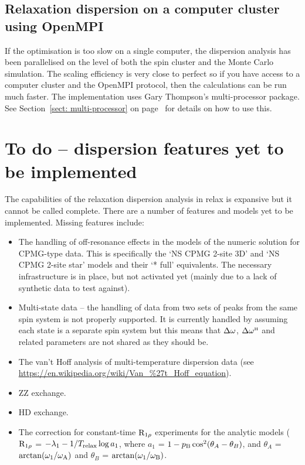 
\subsection{Relaxation dispersion on a computer cluster using OpenMPI}
\label{sect: Relaxation dispersion using OpenMPI}

If the optimisation is too slow on a single computer, the dispersion analysis has been parallelised on the level of both the spin cluster and the Monte Carlo simulation.
The scaling efficiency is very close to perfect so if you have access to a computer cluster and the OpenMPI protocol, then the calculations can be run much faster.
The implementation uses Gary Thompson's multi-processor package.
See Section~\ref{sect: multi-processor} on page~\pageref{sect: multi-processor} for details on how to use this.




\section{To do -- dispersion features yet to be implemented}
\label{sect: dispersion: TODO}

The capabilities of the relaxation dispersion analysis in relax is expansive but it cannot be called complete.
There are a number of features and models yet to be implemented.
Missing features include:
\begin{itemize}
  \item The handling of off-resonance effects in the models of the numeric solution for CPMG-type data.
    This is specifically the `NS CPMG 2-site 3D' and `NS CPMG 2-site star' models and their `* full' equivalents.
    The necessary infrastructure is in place, but not activated yet (mainly due to a lack of synthetic data to test against).
  \item Multi-state data -- the handling of data from two sets of peaks from the same spin system is not properly supported.
    It is currently handled by assuming each state is a separate spin system but this means that $\Delta\omega$, $\Delta\omega^{\scriptscriptstyle\mathrm{H}}$ and related parameters are not shared as they should be.
  \item The van't Hoff analysis of multi-temperature dispersion data (see \url{https://en.wikipedia.org/wiki/Van\_\%27t\_Hoff\_equation}).
  \item ZZ exchange.
  \item HD exchange.
  \item The \citet{Korzhnev05a} correction for constant-time $\mathrm{R}_{1\rho}$ experiments for the analytic models ($\mathrm{R}_{1\rho}$ = $-\lambda_1 -1/T_\textrm{relax}\log{a_1}$, where $a_1$ = $1 - p_\textrm{B}\cos^2(\theta_A - \theta_B)$, and $\theta_A$ = $\arctan(\omega_1/\omega_\textrm{A})$ and $\theta_B$ = $\arctan(\omega_1/\omega_\textrm{B})$.
\end{itemize}

